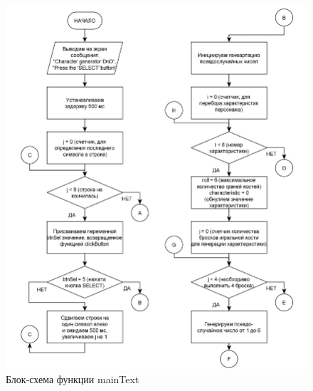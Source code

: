 \documentclass{altsu-report}
\begin{document}
\begin{figure}[H]
    \centering
    \includegraphics[scale=0.8]{mainText1.png}
    \caption{Блок-схема функции mainText}
    \label{fig:main1}
\end{figure}
\end{document}
